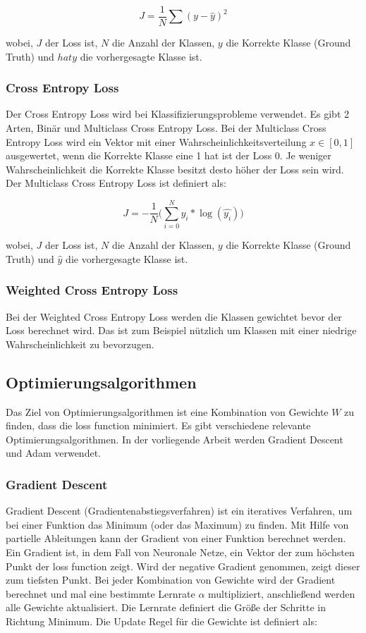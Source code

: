 \begin{equation}
  J = \frac{1}{N} \sum (y - \hat{y})^2
\end{equation}

wobei, $J$ der Loss ist, $N$ die Anzahl der Klassen, $y$ die Korrekte Klasse (Ground Truth) und $ hat{y}$ die vorhergesagte Klasse ist.

\subsubsection{Cross Entropy Loss}
Der Cross Entropy Loss wird bei Klassifizierungsprobleme verwendet. Es gibt 2 Arten, Binär und Multiclass Cross Entropy Loss. 
Bei der Multiclass Cross Entropy Loss wird ein Vektor mit einer Wahrscheinlichkeitsverteilung $ x \in [0, 1] $ 
ausgewertet, wenn die Korrekte Klasse eine 1 hat ist der Loss 0. Je weniger Wahrscheinlichkeit die Korrekte Klasse besitzt desto höher der Loss 
sein wird. Der Multiclass Cross Entropy Loss ist definiert als: 

\begin{equation}
  J = -\frac{1}{N} \Big(\sum_{i=0}^N y_{i} * \log(\hat{y_{i}})\Big)
\end{equation}

wobei, $J$ der Loss ist, $N$ die Anzahl der Klassen, $y$ die Korrekte Klasse (Ground Truth) und $ \hat{y}$ die vorhergesagte Klasse ist.

\subsubsection{Weighted Cross Entropy Loss}
Bei der Weighted Cross Entropy Loss werden die Klassen gewichtet bevor der Loss berechnet wird. Das ist zum Beispiel nützlich um Klassen  
mit einer niedrige Wahrscheinlichkeit zu bevorzugen.

\subsection{Optimierungsalgorithmen}
Das Ziel von Optimierungsalgorithmen ist eine Kombination von Gewichte $ W $ zu finden, dass die \gls{loss function} minimiert.
Es gibt verschiedene relevante Optimierungsalgorithmen. In der vorliegende Arbeit werden Gradient Descent und Adam verwendet.

\subsubsection{Gradient Descent}
Gradient Descent (Gradientenabstiegsverfahren) ist ein iteratives Verfahren, um bei einer Funktion das Minimum (oder das Maximum) zu finden. 
Mit Hilfe von partielle Ableitungen kann der Gradient von einer Funktion berechnet werden. Ein Gradient ist, in dem Fall von Neuronale 
Netze, ein Vektor der zum höchsten Punkt der \gls{loss function} zeigt. Wird der negative Gradient genommen, zeigt dieser zum tiefsten Punkt.
Bei jeder Kombination von Gewichte wird der Gradient berechnet und mal eine bestimmte Lernrate $ \alpha $ multipliziert, anschließend werden 
alle Gewichte aktualisiert. Die Lernrate definiert die Größe der Schritte in Richtung Minimum. Die Update Regel für die Gewichte ist definiert als:

